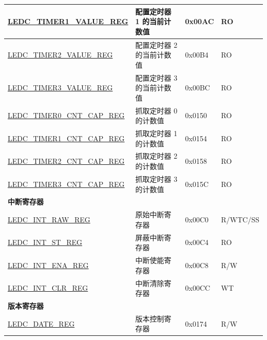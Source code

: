\begin{longtable}{ | p{5.5cm} | p{6.8cm} | p{1.3cm} | p{2cm} | }
    \hyperref[regdesc:LEDCTIMERNVALUEREG]{LEDC\_TIMER1\_VALUE\_REG} & 配置定时器 1 的当前计数值 & 0x00AC & RO \\ \hline
    \hyperref[regdesc:LEDCTIMERNVALUEREG]{LEDC\_TIMER2\_VALUE\_REG} & 配置定时器 2 的当前计数值 & 0x00B4 & RO \\ \hline
    \hyperref[regdesc:LEDCTIMERNVALUEREG]{LEDC\_TIMER3\_VALUE\_REG} & 配置定时器 3 的当前计数值 & 0x00BC & RO \\ \hline
    \hyperref[regdesc:LEDCTIMERNCNTCAPREG]{LEDC\_TIMER0\_CNT\_CAP\_REG} & 抓取定时器 0 的计数值 & 0x0150 & RO \\ \hline
    \hyperref[regdesc:LEDCTIMERNCNTCAPREG]{LEDC\_TIMER1\_CNT\_CAP\_REG} & 抓取定时器 1 的计数值 & 0x0154 & RO \\ \hline
    \hyperref[regdesc:LEDCTIMERNCNTCAPREG]{LEDC\_TIMER2\_CNT\_CAP\_REG} & 抓取定时器 2 的计数值 & 0x0158 & RO \\ \hline
    \hyperref[regdesc:LEDCTIMERNCNTCAPREG]{LEDC\_TIMER3\_CNT\_CAP\_REG} & 抓取定时器 3 的计数值 & 0x015C & RO \\ \hline
    \multicolumn{4}{|l|}{\textbf{中断寄存器}} \\ \hline
    \hyperref[regdesc:LEDCINTRAWREG]{LEDC\_INT\_RAW\_REG} & 原始中断寄存器 & 0x00C0 & R/WTC/SS \\ \hline
    \hyperref[regdesc:LEDCINTSTREG]{LEDC\_INT\_ST\_REG} & 屏蔽中断寄存器 & 0x00C4 & RO \\ \hline
    \hyperref[regdesc:LEDCINTENAREG]{LEDC\_INT\_ENA\_REG} & 中断使能寄存器 & 0x00C8 & R/W \\ \hline
    \hyperref[regdesc:LEDCINTCLRREG]{LEDC\_INT\_CLR\_REG} & 中断清除寄存器 & 0x00CC & WT \\ \hline
    \multicolumn{4}{|l|}{\textbf{版本寄存器}} \\ \hline
    \hyperref[regdesc:LEDCDATEREG]{LEDC\_DATE\_REG} & 版本控制寄存器 & 0x0174 & R/W \\ \hline
    \end{longtable}
